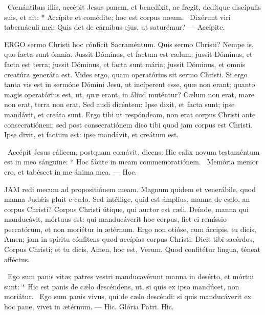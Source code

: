 \R\ Cœnántibus illis, accépit Jesus panem, et benedíxit, ac fregit, dedítque discípulis suis, et ait: * Accípite et comédite; hoc est corpus meum. \V\ Dixérunt viri tabernáculi mei: Quis det de cárnibus ejus, ut saturémur? --- Accípite.


\lettrine[lines=2]{E}{RGO} sermo Christi hoc cónficit Sacraméntum. Quis sermo Christi? Nempe is, quo facta sunt ómnia. Jussit Dóminus, et factum est cælum; jussit Dóminus, et facta est terra; jussit Dóminus, et facta sunt mária; jussit Dóminus, et omnis creatúra generáta est. Vides ergo, quam operatórius sit sermo Christi. Si ergo tanta vis est in sermóne Dómini Jesu, ut incíperent esse, quæ non erant; quanto magis operatórius est, ut, quæ erant, in áliud muténtur? Cælum non erat, mare non erat, terra non erat. Sed audi dicéntem: Ipse dixit, et facta sunt; ipse mandávit, et creáta sunt. Ergo tibi ut respóndeam, non erat corpus Christi ante consecratiónem; sed post consecratiónem dico tibi quod jam corpus est Christi. Ipse dixit, et factum est: ipse mandávit, et creátum est.

\R\ Accépit Jesus cálicem, postquam cœnávit, dicens: Hic calix novum testaméntum est in meo sánguine: * Hoc fácite in meam commemoratiónem. \V\ Memória memor ero, et tabéscet in me ánima mea. --- Hoc.


\lettrine[lines=2]{J}{AM} redi mecum ad propositiónem meam. Magnum quidem et venerábile, quod manna Judǽis pluit e cælo. Sed intéllige, quid est ámplius, manna de cælo, an corpus Christi? Corpus Christi útique, qui auctor est cæli. Deínde, manna qui manducávit, mórtuus est: qui manducáverit hoc corpus, fiet ei remíssio peccatórum, et non moriétur in ætérnum. Ergo non otióse, cum áccipis, tu dicis, Amen; jam in spíritu cónfitens quod accípias corpus Christi. Dicit tibi sacérdos, Corpus Christi; et tu dicis, Amen, hoc est, Verum. Quod confitétur lingua, téneat afféctus.

\R\ Ego sum panis vitæ; patres vestri manducavérunt manna in desérto, et mórtui sunt: * Hic est panis de cælo descéndens, ut, si quis ex ipso mandúcet, non moriátur. \V\ Ego sum panis vivus, qui de cælo descéndi: si quis manducáverit ex hoc pane, vivet in ætérnum. --- Hic. Glória Patri. Hic.




